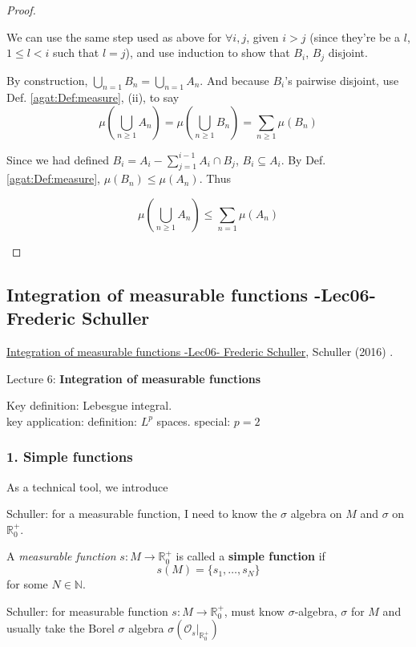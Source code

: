 \begin{proof}
\begin{enumerate}
We can use the same step used as above for $\forall i, j$, given $i > j$ (since they're be a $l$, $1 \leq l < i$ such that $l = j$), and use induction to show that $B_i$, $B_j$ disjoint.	

By construction, $\bigcup_{n=1}B_n = \bigcup_{n=1} A_n$. And because $B_i$'s pairwise disjoint, use Def. \ref{agat:Def:measure}, (ii), to say
\[
\mu(\bigcup_{n \geq 1} A_n) = \mu(\bigcup_{n \geq 1} B_n) = \sum_{n\geq 1} \mu(B_n)
\]

Since we had defined $B_i = A_i - \sum_{j=1}^{i-1} A_i \cap B_j$, $B_i \subseteq A_i$. By Def. \ref{agat:Def:measure}, $\mu(B_n) \leq \mu(A_n)$. Thus

\[
\mu(\bigcup_{n \geq 1} A_n) \leq \sum_{n=1} \mu(A_n)
\]

\end{enumerate}	
\end{proof}

\subsection{Integration of measurable functions -Lec06- Frederic Schuller}

\href{https://youtu.be/ot253Lhx2_o?si=0teIskVSrMHCaoGU}{Integration of measurable functions -Lec06- Frederic Schuller}, Schuller (2016) \cite{agat:Schu2016}.

Lecture 6: \textbf{Integration of measurable functions}

Key definition: Lebesgue integral.\\
key application: definition: $L^p$ spaces. special: $p=2$

\subsubsection{1. Simple functions}

As a technical tool, we introduce

Schuller: for a measurable function, I need to know the $\sigma$ algebra on $M$ and $\sigma$ on $\mathbb{R}_0^+$.
\begin{definition} A \emph{measurable function} $s: M \to \mathbb{R}_0^+$ is called a \textbf{simple function} if 
	\[
	s(M) = \lbrace s_1, \dots , s_N \rbrace
	\]
for some $N\in \mathbb{N}$.
\end{definition}

Schuller: for measurable function $s:M \to \mathbb{R}_0^+$, must know $\sigma$-algebra, $\sigma$ for $M$ and usually take the Borel $\sigma$ algebra $\sigma (\left. \mathcal{O}_s \right|_{\mathbb{R}_0^+} )$

